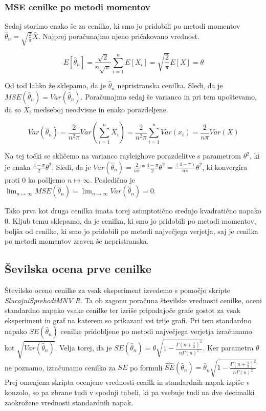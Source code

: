 \documentclass[a4paper, 10pt]{article}
\begin{document}
	\subsubsection{MSE cenilke po metodi momentov}\label{subsubsect: 2C2}
	Sedaj storimo enako še za cenilko, ki smo jo pridobili po metodi momentov $\widehat{\theta}_n = \sqrt{\frac{2}{\pi}}\bar{X}$. Najprej poračunajmo njeno pričakovano vrednost.
	
	\begin{equation*}		
		E[\widehat{\theta}_n] = \frac{\sqrt{2}}{n\sqrt{\pi}} \sum_{i=1}^{n} E[X_i] = \sqrt{\frac{2}{\pi}} E[X] = \theta
	\end{equation*}
	
	Od tod lahko že sklepamo, da je $\widehat{\theta}_n$ nepristranska cenilka. Sledi, da je $MSE(\widehat{\theta}_n) = Var(\widehat{\theta}_n)$. Poračunajmo sedaj še varianco in pri tem upoštevamo, da so $X_i$ medseboj neodvisne in enako porazdeljene.
	
	\begin{equation*}		
		Var(\widehat{\theta}_n) = \frac{2}{n^2\pi}Var(\sum_{i = 1}^{n}X_i) = \frac{2}{n^2 \pi} \sum_{i = 1}^{n}Var(x_i) = \frac{2}{n \pi} Var(X)
	\end{equation*}
	
	Na tej točki se skličemo na varianco rayleighove porazdelitve s parametrom $\theta^2$, ki je enaka $\frac{4 - \pi}{2}\theta^2$. Sledi, da je $Var(\widehat{\theta}_n) = \frac{2}{n\pi} * \frac{4 - \pi}{2}\theta^2 = \frac{(4-\pi)}{n\pi}\theta^2$, ki konvergira proti $0$ ko pošljemo $n\mapsto\infty$. Posledično je $\lim_{n\mapsto\infty}MSE(\widehat{\theta}_n) = \lim_{n\mapsto\infty} Var(\widehat{\theta}_n) =0$.
	
	Tako prva kot druga cenilka imata torej asimptotično srednjo kvadratično napako $0$. Kljub temu sklepamo, da je cenilka, ki smo jo pridobili po metodi momentov, boljša od cenilke, ki smo jo pridobili po metodi največjega verjetja, saj je cenilka po metodi momentov zraven še nepristranska.
	
	\subsection{Ševilska ocena prve cenilke} \label{subsect: 2D}
	
	Številsko oceno cenilke za vsak eksperiment izvedemo s pomočjo skripte \textit{SlucajniSprehodiMNV.R}. Ta ob zagonu poračuna številske vrednosti cenilke, oceni standardno napako vsake cenilke ter izriše pripadajoče grafe gostot za vsak eksperiment in graf na katerem so prikazani vsi trije grafi. Pri tem standardno napako $SE(\widehat{\theta}_n)$ cenilke pridobljene po metodi največjega verjetja izračunamo kot $\sqrt{Var(\widehat{\theta}_n)}$. Velja torej, da je $SE(\widehat{\theta}_n) = \theta\sqrt{1 - \frac{\Gamma(n + \frac{1}{2})^2}{n\Gamma(n)^2}}$. Ker parametra $\theta$ ne poznamo, izračunamo cenilko za $SE$ po formuli $\widehat{SE}(\widehat{\theta}_n) = \widehat{\theta}_n \sqrt{1 - \frac{\Gamma(n + \frac{1}{2})^2}{n\Gamma(n)^2}}$
	Prej omenjena skripta ocenjene vrednosti cenilk in standardnih napak izpiše v konzolo, so pa zbrane tudi v spodnji tabeli, ki pa vsebuje tudi na dve decimalki zaokrožene vrednosti standardnih napak.
	
\end{document}
